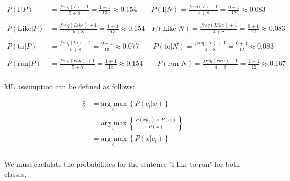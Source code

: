 \documentclass[12pt]{article}
\begin{document}
\begin{enumerate}[leftmargin=\labelsep]
    \begin{equation*}
        \begin{aligned}
            P(\text{I}|P) &= \frac{freq(I) + 1}{5+8} = \frac{1+1}{13} \approx 0.154 \qquad P(\text{I}|N) = \frac{freq(I) + 1}{4+8} = \frac{0+1}{12} \approx 0.083\\
            \\
            P(\text{Like}|P) &= \frac{freq(Like) + 1}{5+8} = \frac{1+1}{13} \approx 0.154  \quad P(\text{Like}|N) = \frac{freq(Like) + 1}{4+8} = \frac{0+1}{12} \approx 0.083\\
            \\
            P(\text{to}|P) &= \frac{freq(to) + 1}{5+8} = \frac{0+1}{13} \approx 0.077 \qquad P(\text{to}|N) = \frac{freq(to) + 1}{4+8} = \frac{0+1}{12} \approx 0.083\\
            \\
            P(\text{run}|P) &= \frac{freq(run) + 1}{5+8} = \frac{1+1}{13} \approx 0.154 \qquad P(\text{run}|N) = \frac{freq(run) + 1}{4+8} = \frac{1+1}{12} \approx 0.167\\
        \end{aligned}
    \end{equation*}

    \vspace{10pt}
    ML assumption can be defined as follows:

    \begin{equation}\label{ml}
        \begin{aligned}
            \hat{z} & = \underset{c_i}{\text{arg max}} \medspace \left\{P(c_i | x)\right\} \\
                    & = \underset{c_i}{\text{arg max}} \medspace \left\{\frac{P(x | c_i)  \times P(c_i)}{P(x)}\right\} \\
                    & = \underset{c_i}{\text{arg max}} \medspace \left\{P(x | c_i)\right\} \\
        \end{aligned}
    \end{equation}
   
    We must caclulate the probabilities for the sentence "I like to run" for both classes.


\end{enumerate}
\end{document}
